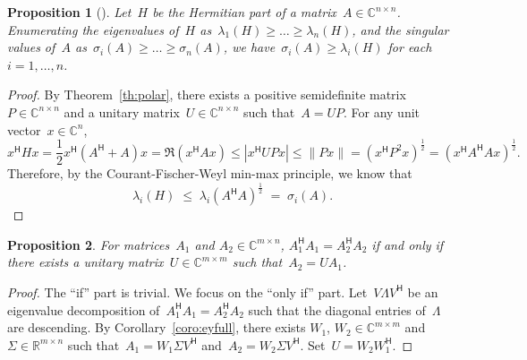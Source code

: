 \documentclass[11pt,a4paper]{article}  %
\newcommand{\bibfile}{svd.bib}  %
\numberwithin{equation}{section}
\newtheorem{proposition}{Proposition}%
\theoremstyle{definition}
\def\RR{\mathbb{R}}
\def\CC{\mathbb{C}}
\newcommand{\hmt}{{\scriptscriptstyle{{\mathsf{H}}}}}
\begin{document}
\begin{proposition}[\cite{Fan_Hoffman_1955}]
  Let~$H$ be the Hermitian part of a matrix~$A \in \CC^{n\times n}$. Enumerating the eigenvalues
  of~$H$ as~$\lambda_1(H) \ge\dots\ge \lambda_n(H)$, and the singular values of~$A$
  as~$\sigma_i(A) \ge\dots\ge \sigma_n(A)$, we have~$\sigma_{i}(A)\ge
  \lambda_i(H)$ for each~$i = 1, \dots, n$.
\end{proposition}

\begin{proof}
  By Theorem~\ref{th:polar}, there exists a positive semidefinite matrix~$P\in \CC^{n\times n}$ and
  a unitary matrix~$U\in \CC^{n\times n}$ such that~$A = UP$. For any unit vector~$x\in \CC^n$,
  \begin{equation*}
    x^\hmt H x = \frac{1}{2}x^\hmt (A^\hmt + A)x = \Re(x^\hmt A x) \le %
    |x^\hmt U P x|\le \|Px\| = (x^\hmt P^2 x)^{\frac{1}{2}} =(x^\hmt A^\hmt A x)^{\frac{1}{2}}.
  \end{equation*}
  Therefore, by the Courant-Fischer-Weyl min-max principle, we know that
  \begin{equation*}
    \lambda_i(H) \;\le\; \lambda_i(A^\hmt A)^{\frac{1}{2}}\;=\; \sigma_i(A).
  \end{equation*}
\end{proof}

\begin{proposition}
  For matrices~$A_1$ and $A_2 \in \CC^{m\times n}$, $A_1^\hmt A_1 = A_2^\hmt A_2$ if and only if there exists a unitary
  matrix~$U \in \CC^{m\times m}$ such that~$A_2 = UA_1$.
\end{proposition}

\begin{proof}
  The ``if'' part is trivial. We focus on the ``only if'' part.
  Let~$V \Lambda V^\hmt$ be an eigenvalue decomposition of~$A_1^\hmt A_1 = A_2^\hmt A_2$ such that
  the diagonal entries of~$\Lambda$ are descending. By
  Corollary~\ref{coro:eyfull}, there exists $W_1$, $W_2\in \CC^{m\times m}$ and~$\Sigma \in \RR^{m\times n}$
  such that~$A_1=W_1 \Sigma V^\hmt$
  and~$A_2 = W_2 \Sigma V^\hmt$. Set~$U = W_2W_1^\hmt$.
\end{proof}

\small


\end{document}
